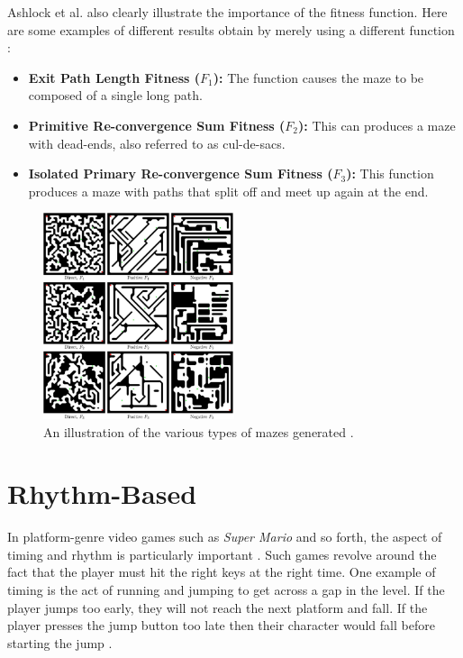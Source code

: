 Ashlock et al. also clearly illustrate the importance of the fitness function. Here are some examples of different results obtain by merely using a different function \citep{DBLP:journals/tciaig/AshlockLM11}:
\begin{itemize}
\item {\bf Exit Path Length Fitness ($F_1$):} The function causes the maze to be composed of a single long path.
\item {\bf Primitive Re-convergence Sum Fitness ($F_2$):} This can produces a maze with dead-ends, also referred to as cul-de-sacs.
\item {\bf Isolated Primary Re-convergence Sum Fitness ($F_3$):} This function produces a maze with paths that split off and meet up again at the end.
\end{itemize}

\begin{figure}[h!]
  \centering
    \includegraphics[width=0.50\textwidth]{images/ashlockMazes.png}
  \caption{An illustration of the various types of mazes generated \citep{DBLP:journals/tciaig/AshlockLM11}.}
\end{figure}


\section{Rhythm-Based} 
In platform-genre video games such as {\em Super Mario} and so forth, the aspect of timing and rhythm is particularly important \citep{DBLP:journals/tciaig/SmithWMTMC11}. Such games revolve around the fact that the player must hit the right keys at the right time. One example of timing is the act of running and jumping to get across a gap in the level. If the player jumps too early, they will not reach the next platform and fall. If the player presses the jump button too late then their character would fall before starting the jump \citep{Smith:2008:FAP:1401843.1401858}.

